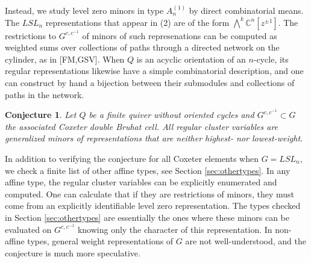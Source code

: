 \documentclass[12pt]{amsart}
\newcommand{\CC}{\mathbb{C}}
\newtheorem{theorem}{Theorem}[section]
\newtheorem{conjecture}[theorem]{Conjecture}
\numberwithin{equation}{section}
\begin{document}
Instead, we study level zero minors in type $A_n^{(1)}$ by direct combinatorial means. The $LSL_n$ representations that appear in (2) are of the form $\bigwedge^k\CC^n[z^{\pm 1}]$. The restrictions to $G^{c,c^{-1}}$ of minors of such represenations can be computed as weighted sums over collections of paths through a directed network on the cylinder, as in [FM,GSV]. When $Q$ is an acyclic orientation of an $n$-cycle, its regular representations likewise have a simple combinatorial description, and one can construct by hand a bijection between their submodules and collections of paths in the network.


\begin{conjecture}\label{conj:mainconjecture}
Let $Q$ be a finite quiver without oriented cycles and $G^{c,c^{-1}} \subset G$ the associated Coxeter double Bruhat cell. All regular cluster variables are generalized minors of representations that are neither highest- nor lowest-weight.
\end{conjecture}

In addition to verifying the conjecture for all Coxeter elements when $G = LSL_n$, we check a finite list of other affine types, see Section \ref{sec:othertypes}. In any affine type, the regular cluster variables can be explicitly enumerated and computed. One can calculate that if they are restrictions of minors, they must come from an explicitly identifiable level zero representation. The types checked in Section \ref{sec:othertypes} are essentially the ones where these minors can be evaluated on $G^{c,c^{-1}}$ knowing only the character of this representation. In non-affine types, general weight representations of $G$ are not well-understood, and the conjecture is much more speculative.
\end{document}
